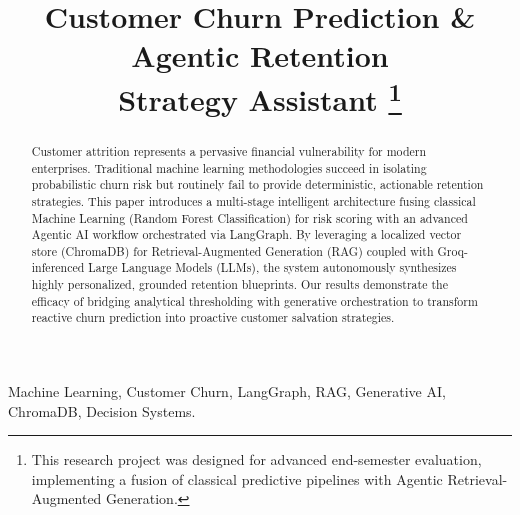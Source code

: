 \documentclass[conference, a4paper]{IEEEtran}
\begin{document}
\title{Customer Churn Prediction \& Agentic Retention \\ Strategy Assistant
\thanks{This research project was designed for advanced end-semester evaluation, implementing a fusion of classical predictive pipelines with Agentic Retrieval-Augmented Generation.}
}

\author{
\and
{}
\and
{}
}

\maketitle

\begin{abstract}
Customer attrition represents a pervasive financial vulnerability for modern enterprises. Traditional machine learning methodologies succeed in isolating probabilistic churn risk but routinely fail to provide deterministic, actionable retention strategies. This paper introduces a multi-stage intelligent architecture fusing classical Machine Learning (Random Forest Classification) for risk scoring with an advanced Agentic AI workflow orchestrated via LangGraph. By leveraging a localized vector store (ChromaDB) for Retrieval-Augmented Generation (RAG) coupled with Groq-inferenced Large Language Models (LLMs), the system autonomously synthesizes highly personalized, grounded retention blueprints. Our results demonstrate the efficacy of bridging analytical thresholding with generative orchestration to transform reactive churn prediction into proactive customer salvation strategies.
\end{abstract}

\begin{IEEEkeywords}
Machine Learning, Customer Churn, LangGraph, RAG, Generative AI, ChromaDB, Decision Systems.
\end{IEEEkeywords}
\end{document}
